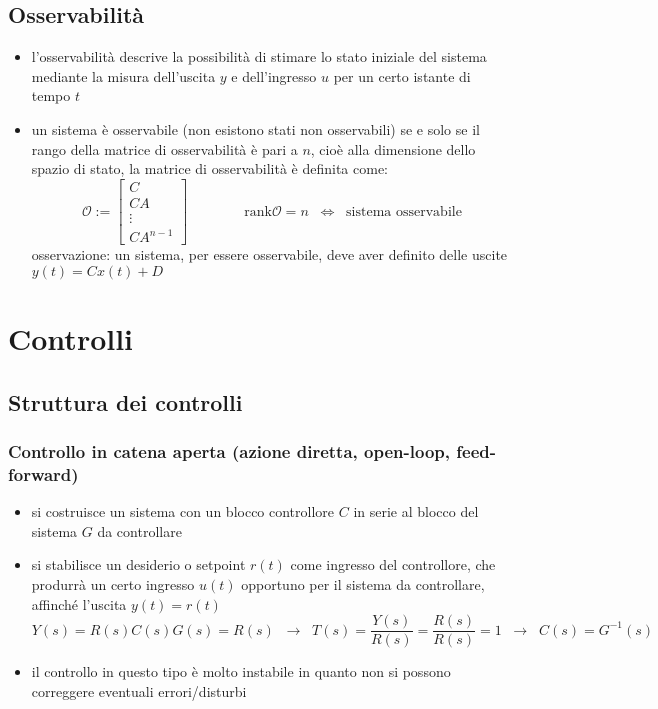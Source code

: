 \subsection{Osservabilità}
\begin{itemize}
	\item l'osservabilità descrive la possibilità di stimare lo stato iniziale del sistema mediante la misura dell'uscita \(y\) e
	dell'ingresso \(u\) per un certo istante di tempo \(t\)
	\item un sistema è osservabile (non esistono stati non osservabili) se e solo se il rango della matrice di osservabilità è pari
	a \(n\), cioè alla dimensione dello spazio di stato, la matrice di osservabilità è definita come:
	\[\mathcal{O}:= \left[\begin{matrix}
		C \\ CA \\ \vdots \\ C A^{n-1}
	\end{matrix}\right] \qquad\qquad \text{rank} \mathcal{O} = n \;\; \Leftrightarrow \;\; \text{sistema osservabile}\]
	osservazione: un sistema, per essere osservabile, deve aver definito delle uscite \(y(t) = Cx(t) + D\)
\end{itemize}

\newpage

\section{Controlli}
\subsection{Struttura dei controlli}
\subsubsection*{Controllo in catena aperta (azione diretta, open-loop, feed-forward)}
\begin{itemize}
	\item si costruisce un sistema con un blocco controllore \(C\) in serie al blocco del sistema \(G\) da controllare
	\item si stabilisce un desiderio o setpoint \(r(t)\) come ingresso del controllore, che produrrà un certo ingresso \(u(t)\)
	opportuno per il sistema da controllare, affinché l'uscita \(y(t) = r(t)\)
	\[Y(s) = R(s)C(s)G(s) = R(s) \;\; \rightarrow \;\; T(s) = \frac{Y(s)}{R(s)} = \frac{R(s)}{R(s)} = 1 \;\; \rightarrow \;\; C(s) = G^{-1}(s)\]
	\item il controllo in questo tipo è molto instabile in quanto non si possono correggere eventuali errori/disturbi
\end{itemize}

